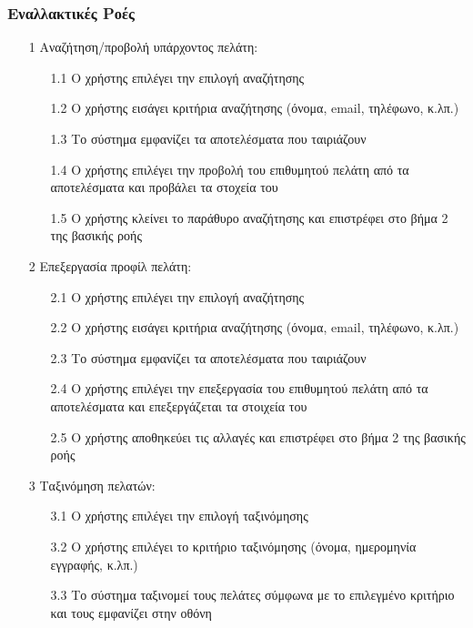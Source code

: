 \documentclass[12pt,a4paper,twoside]{book}
\begin{document}
\subsubsection{Εναλλακτικές Ροές}
\begin{enumerate}
  \item[1 ] Αναζήτηση/προβολή υπάρχοντος πελάτη:
        \begin{enumerate}
          \item[1.1 ] Ο χρήστης επιλέγει την επιλογή αναζήτησης
          \item[1.2 ] Ο χρήστης εισάγει κριτήρια αναζήτησης (όνομα, email, τηλέφωνο, κ.λπ.)
          \item[1.3 ] Το σύστημα εμφανίζει τα αποτελέσματα που ταιριάζουν
          \item[1.4 ] Ο χρήστης επιλέγει την προβολή του επιθυμητού πελάτη από τα αποτελέσματα και προβάλει τα στοχεία του
          \item[1.5 ] Ο χρήστης κλείνει το παράθυρο αναζήτησης και επιστρέφει στο βήμα 2 της βασικής ροής
        \end{enumerate}
  \item[2 ] Επεξεργασία προφίλ πελάτη:
        \begin{enumerate}
          \item [2.1 ] Ο χρήστης επιλέγει την επιλογή αναζήτησης
          \item [2.2 ] Ο χρήστης εισάγει κριτήρια αναζήτησης (όνομα, email, τηλέφωνο, κ.λπ.)
          \item [2.3 ] Το σύστημα εμφανίζει τα αποτελέσματα που ταιριάζουν
          \item [2.4 ] Ο χρήστης επιλέγει την επεξεργασία του επιθυμητού πελάτη από τα αποτελέσματα και επεξεργάζεται τα στοιχεία του
          \item [2.5 ] Ο χρήστης αποθηκεύει τις αλλαγές και επιστρέφει στο βήμα 2 της βασικής ροής
        \end{enumerate}
  \item[3 ] Ταξινόμηση πελατών:
        \begin{enumerate}
          \item [3.1 ] Ο χρήστης επιλέγει την επιλογή ταξινόμησης
          \item [3.2 ] Ο χρήστης επιλέγει το κριτήριο ταξινόμησης (όνομα, ημερομηνία εγγραφής, κ.λπ.)
          \item [3.3 ] Το σύστημα ταξινομεί τους πελάτες σύμφωνα με το επιλεγμένο κριτήριο και τους εμφανίζει στην οθόνη
        \end{enumerate}

\end{enumerate}
\end{document}
